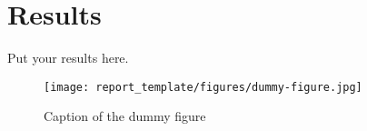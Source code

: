 \section{Results} \label{sec:results}

Put your results here.

\begin{figure}[thbp]
    \centering
    \texttt{[image: report\_template/figures/dummy-figure.jpg]}
    \caption{Caption of the dummy figure}
    \label{fig:dummy_figure}
\end{figure}